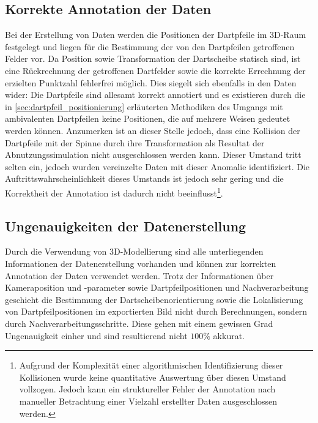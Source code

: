 \subsection{Korrekte Annotation der Daten}  %
\label{sec:korrekte_annotation}  %

Bei der Erstellung von Daten werden die Positionen der Dartpfeile im 3D-Raum festgelegt und liegen für die Bestimmung der von den Dartpfeilen getroffenen Felder vor. Da Position sowie Transformation der Dartscheibe statisch sind, ist eine Rückrechnung der getroffenen Dartfelder sowie die korrekte Errechnung der erzielten Punktzahl fehlerfrei möglich. Dies siegelt sich ebenfalls in den Daten wider: Die Dartpfeile sind allesamt korrekt annotiert und es existieren durch die in \autoref{sec:dartpfeil_positionierung} erläuterten Methodiken des Umgangs mit ambivalenten Dartpfeilen keine Positionen, die auf mehrere Weisen gedeutet werden können. Anzumerken ist an dieser Stelle jedoch, dass eine Kollision der Dartpfeile mit der Spinne durch ihre Transformation als Resultat der Abnutzungssimulation nicht ausgeschlossen werden kann. Dieser Umstand tritt selten ein, jedoch wurden vereinzelte Daten mit dieser Anomalie identifiziert. Die Auftrittswahrscheinlichkeit dieses Umstands ist jedoch sehr gering und die Korrektheit der Annotation ist dadurch nicht beeinflusst\footnote{Aufgrund der Komplexität einer algorithmischen Identifizierung dieser Kollisionen wurde keine quantitative Auswertung über diesen Umstand vollzogen. Jedoch kann ein struktureller Fehler der Annotation nach manueller Betrachtung einer Vielzahl erstellter Daten ausgeschlossen werden.}.

\subsection{Ungenauigkeiten der Datenerstellung}  %
\label{sec:daten_ungenauigkeiten}

Durch die Verwendung von 3D-Modellierung sind alle unterliegenden Informationen der Datenerstellung vorhanden und können zur korrekten Annotation der Daten verwendet werden. Trotz der Informationen über Kameraposition und -parameter sowie Dartpfeilpositionen und Nachverarbeitung geschieht die Bestimmung der Dartscheibenorientierung sowie die Lokalisierung von Dartpfeilpositionen im exportierten Bild nicht durch Berechnungen, sondern durch Nachverarbeitungsschritte. Diese gehen mit einem gewissen Grad Ungenauigkeit einher und sind resultierend nicht $100\%$ akkurat.

